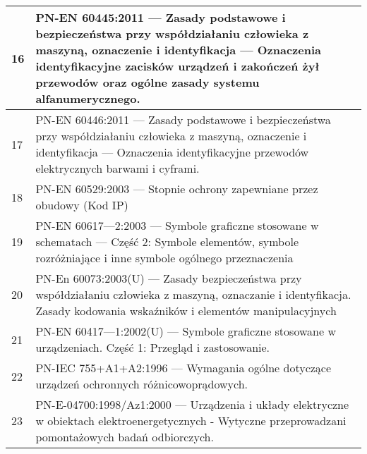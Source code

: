 {\begin{tabular}{ | p{} | p{} | }
        16 & PN-EN 60445:2011 — Zasady podstawowe i bezpieczeństwa przy współdziałaniu człowieka z maszyną, oznaczenie i identyfikacja — Oznaczenia identyfikacyjne zacisków urządzeń i zakończeń żył przewodów oraz ogólne zasady systemu alfanumerycznego.                                                         \\ \hline
        17 & PN-EN 60446:2011 — Zasady podstawowe i bezpieczeństwa przy współdziałaniu człowieka z maszyną, oznaczenie i identyfikacja — Oznaczenia identyfikacyjne przewodów elektrycznych barwami i cyframi.                                                                                                       \\ \hline
        18 & PN-EN 60529:2003 — Stopnie ochrony zapewniane przez obudowy (Kod IP)                                                                                                                                                                                                                                    \\ \hline
        19 & PN-EN 60617—2:2003 — Symbole graficzne stosowane w schematach — Część 2: Symbole elementów, symbole rozróżniające i inne symbole ogólnego przeznaczenia                                                                                                                                                 \\ \hline
        20 & PN-En 60073:2003(U) — Zasady bezpieczeństwa przy współdziałaniu człowieka z maszyną, oznaczanie i identyfikacja. Zasady kodowania wskaźników i elementów manipulacyjnych                                                                                                                                \\ \hline
        21 & PN-EN 60417—1:2002(U) — Symbole graficzne stosowane w urządzeniach. Część 1: Przegląd i zastosowanie.                                                                                                                                                                                                   \\ \hline
        22 & PN-IEC 755+A1+A2:1996 — Wymagania ogólne dotyczące urządzeń ochronnych różnicowoprądowych.                                                                                                                                                                                                              \\ \hline
        23 & PN-E-04700:1998/Az1:2000 — Urządzenia i układy elektryczne w obiektach elektroenergetycznych - Wytyczne przeprowadzani pomontażowych badań odbiorczych.                                                                                                                                                 \\ \hline

\end{tabular}}
